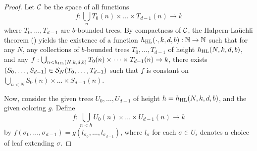 \begin{proof}
  Let $\mathcal{C}$ be the space of all functions
  \[
    f: \bigcup_n T_0(n)\times\dots\times T_{d-1}(n) \to k
  \]
  where $T_0,\dots,T_{d-1}$ are $b$-bounded trees. By compactness of $\mathcal{C}$,
  the Halpern-La\"{u}chli theorem () yields the existence of a function $h_{\mathrm{HL}}(\cdot,k,d, b):\mathbb{N}\to\mathbb{N}$ such that for any $N$, any collections of $b$-bounded trees $T_0,\dots, T_{d-1}$ of height $h_{\mathrm{HL}}(N,k,d,b)$, and any $f: \bigcup_{n<h_{\mathrm{HL}}(N,k,d,b)} {T}_0(n) \times \dots \times {T}_{d-1}(n) \to k$, there exists $(S_0,\dots,S_{d-1}) \in \mathcal{S}_{N}({T_0,\ldots,T_{d-1}})$ such that $f$ is constant on $\bigcup_{n<N} {S}_0(n) \times \dots \times {S}_{d-1}(n)$.
  
  Now, consider the given trees $U_0,\ldots,U_{d-1}$ of height $h = h_{\mathrm{HL}}(N,k,d,b)$, and the given coloring $g$.
  Define
  \[
  	f: \bigcup_{n<h} {U}_0(n) \times \dots \times {U}_{d-1}(n) \to k
  \]
  by $f(\sigma_0,\ldots,\sigma_{d-1}) = g(l_{\sigma_0},\dots, l_{\sigma_{d-1}})$,
  where $l_\sigma$ for each $\sigma \in U_i$ denotes a choice of leaf extending $\sigma$. 
  
  

\end{proof}
